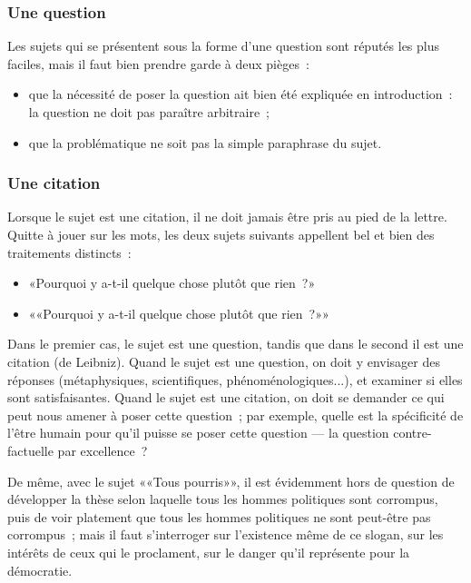 \documentclass[a4paper,11pt]{article}
\begin{document}
\subsubsection{Une question}

Les sujets qui se présentent sous la forme d'une question sont réputés
les plus faciles, mais il faut bien prendre garde à deux pièges~:
\begin{itemize}
\item que la nécessité de poser la question ait bien été expliquée en
  introduction~: la question ne doit pas paraître arbitraire~;
\item que la problématique ne soit pas la simple paraphrase du sujet.
\end{itemize}


\subsubsection{Une citation}

Lorsque le sujet est une citation, il ne doit jamais être pris au pied
de la lettre. Quitte à jouer sur les mots, les deux sujets suivants
appellent bel et bien des traitements distincts~:
\begin{itemize}
\item «Pourquoi y a-t-il quelque chose plutôt que rien~?»
\item ««Pourquoi y a-t-il quelque chose plutôt que rien~?»»
\end{itemize}
Dans le premier cas, le sujet est une question, tandis que dans le
second il est une citation (de Leibniz). Quand le sujet est une
question, on doit y envisager des réponses (métaphysiques,
scientifiques, phénoménologiques...), et examiner si elles sont
satisfaisantes. Quand le sujet est une citation, on doit se demander ce
qui peut nous amener à poser cette question~; par exemple, quelle est la
spécificité de l'être humain pour qu'il puisse se poser cette question
--- la question contre-factuelle par excellence~?

\par

De même, avec le sujet ««Tous pourris»», il est évidemment hors de
question de développer la thèse selon laquelle tous les hommes
politiques sont corrompus, puis de voir platement que tous les hommes
politiques ne sont peut-être pas corrompus~; mais il faut s'interroger
sur l'existence même de ce slogan, sur les intérêts de ceux qui le
proclament, sur le danger qu'il représente pour la démocratie.
\end{document}
